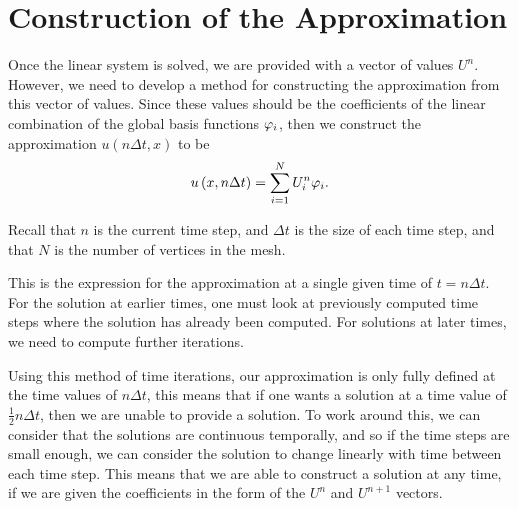 \documentclass[../fem.tex]{subfile}
\begin{document}
\section{Construction of the Approximation}%
\label{sec:construction_of_the_approximation}

Once the linear system is solved, we are provided with a vector of values $U^n$.
However, we need to develop a method for constructing the approximation from
this vector of values. Since these values should be the coefficients of the
linear combination of the global basis functions $\varphi_i$, then we construct the
approximation $u(n\Delta t, x)$ to be
\begin{align*}
  u\left(x, n\Delta t\right)=\sum_{i=1}^NU^n_i\varphi_i.
\end{align*}

Recall that $n$ is the current time step, and $\Delta t$ is the size of each
time step, and that $N$ is the number of vertices in the mesh.

This is the expression for the approximation at a single given time of
$t=n\Delta t$. For the solution at earlier times, one must look at previously
computed time steps where the solution has already been computed. For solutions
at later times, we need to compute further iterations.

Using this method of time iterations, our approximation is only fully defined
at the time values of $n\Delta t$, this means that if one wants a solution at a
time value of $\frac{1}{2}n\Delta t$, then we are unable to provide a solution.
To work around this, we can consider that the solutions are continuous
temporally, and so if the time steps are small enough, we can consider the
solution to change linearly with time between each time step. This means that
we are able to construct a solution at any time, if we are given the
coefficients in the form of the $U^n$ and $U^{n+1}$ vectors.
\end{document}

